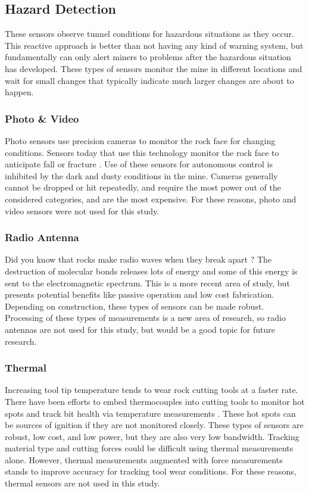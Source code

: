 \subsection{Hazard Detection}

These sensors observe tunnel conditions for hazardous situations as they occur.
This reactive approach is better than not having any kind of warning system, but fundamentally
can only alert miners to problems after the hazardous situation has developed.
These types of sensors monitor the mine in different locations and wait for small changes
that typically indicate much larger changes are about to happen.

\subsubsection{Photo \& Video}
Photo sensors use precision cameras to monitor the rock face for changing conditions.
Sensors today that use this technology monitor the rock face to anticipate fall or fracture \cite{duarte2022sensing}.
Use of these sensors for autonomous control is inhibited by the dark and dusty conditions in the mine.
Cameras generally cannot be dropped or hit repeatedly, and require the most power out of the considered categories,
and are the most expensive. For these reasons, photo and video sensors were not used for this study.

\subsubsection{Radio Antenna}
Did you know that rocks make radio waves when they break apart \cite{qian1996experimental}? 
The destruction of molecular bonds releases lots of energy
 and some of this energy is sent to the electromagnetic spectrum.
This is a more recent area of study, but presents potential benefits like
passive operation and low cost fabrication. 
Depending on construction, these types of sensors can be made robust.
Processing of these types of measurements is a new area of research,
so radio antennas are not used for this study, 
but would be a good topic for future research.

\subsubsection{Thermal}
Increasing tool tip temperature tends to wear rock cutting tools at a faster rate.
There have been efforts to embed thermocouples into cutting tools 
to monitor hot spots and track bit health via temperature measurements \cite{SHAO201839}.
These hot spots can be sources of ignition if they are not monitored closely.
These types of sensors are robust, low cost, and low power, but they are also very low bandwidth.
Tracking material type and cutting forces could be difficult using thermal measurements alone.
However, thermal measurements augmented with force measurements stands to improve accuracy for 
tracking tool wear conditions. For these reasons, thermal sensors are not used in this study.

